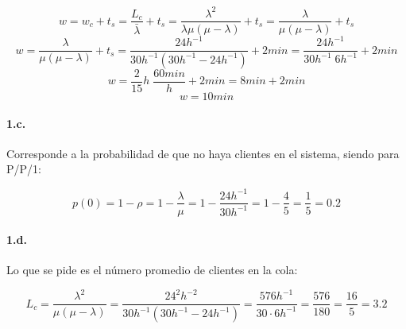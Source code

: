 \documentclass{article}
\begin{document}
    $$ w = w_c + t_s = \frac{L_c}{\bar\lambda} + t_s = \frac{\lambda^2}{\lambda\mu(\mu-\lambda)} + t_s = \frac{\lambda}{\mu(\mu-\lambda)} + t_s $$
    $$ w = \frac{\lambda}{\mu(\mu-\lambda)} + t_s = \frac{24 h^{-1}}{30 h^{-1}(30 h^{-1} - 24 h^{-1})} + 2 min = \frac{24 h^{-1}}{30 h^{-1} \; 6 h^{-1}} + 2 min $$
    $$ w = \frac{2}{15} h \; \frac{60min}{h} + 2 min = 8 min + 2 min $$
    $$ w = 10 min $$

    \paragraph{1.c.} Corresponde a la probabilidad de que no haya clientes en el sistema, siendo para P/P/1:
    
    $$ p(0) = 1 - \rho = 1 - \frac{\lambda}{\mu} = 1 - \frac{24h^{-1}}{30h^{-1}} = 1 - \frac{4}{5} = \frac{1}{5} = 0.2 $$
    
    \paragraph{1.d.} Lo que se pide es el número promedio de clientes en la cola:
    
    $$ L_c = \frac{\lambda^2}{\mu(\mu - \lambda)} = \frac{24^2h^{-2}}{30h^{-1}(30h^{-1}-24h^{-1})} = \frac{576h^{-1}}{30 \cdot 6h^{-1}} = \frac{576}{180} = \frac{16}{5} = 3.2 $$
\end{document}
